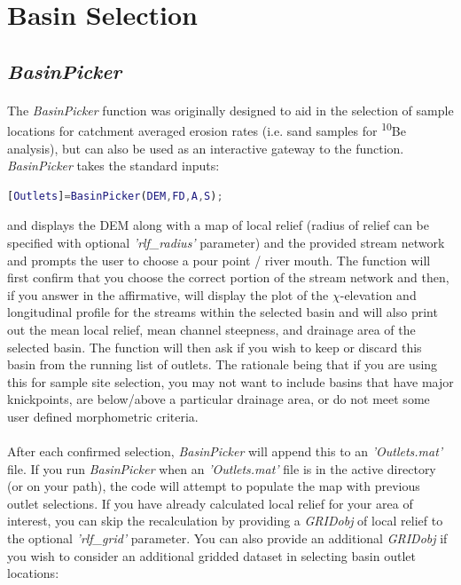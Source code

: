 \section{Basin Selection}

\subsection{\textit{BasinPicker}} \label{sec:BsnPckr}
\paragraph{}The \textit{BasinPicker} function was originally designed to aid in the selection of sample locations for catchment averaged erosion rates (i.e. sand samples for  \textsuperscript{10}Be analysis), but can also be used as an interactive gateway to the  function. \textit{BasinPicker} takes the standard inputs:

\begin{lstlisting}[language=Matlab]
[Outlets]=BasinPicker(DEM,FD,A,S);
\end{lstlisting}

\noindent
 and displays the DEM along with a map of local relief (radius of relief can be specified with optional \textit{'rlf\_radius'} parameter) and the provided stream network and prompts the user to choose a pour point / river mouth. The function will first confirm that you choose the correct portion of the stream network and then, if you answer in the affirmative, will display the plot of the $\chi$-elevation and longitudinal profile for the streams within the selected basin and will also print out the mean local relief, mean channel steepness, and drainage area of the selected basin. The function will then ask if you wish to keep or discard this basin from the running list of outlets. The rationale being that if you are using this for sample site selection, you may not want to include basins that have major knickpoints, are below/above a particular drainage area, or do not meet some user defined morphometric criteria. 

\paragraph{}After each confirmed selection, \textit{BasinPicker} will append this to an \textit{'Outlets.mat'} file. If you run \textit{BasinPicker} when an \textit{'Outlets.mat'} file is in the active directory (or on your path), the code will attempt to populate the map with previous outlet selections. If you have already calculated local relief for your area of interest, you can skip the recalculation by providing a \textit{GRIDobj} of local relief to the optional \textit{'rlf\_grid'} parameter. You can also provide an additional \textit{GRIDobj} if you wish to consider an additional gridded dataset in selecting basin outlet locations:

